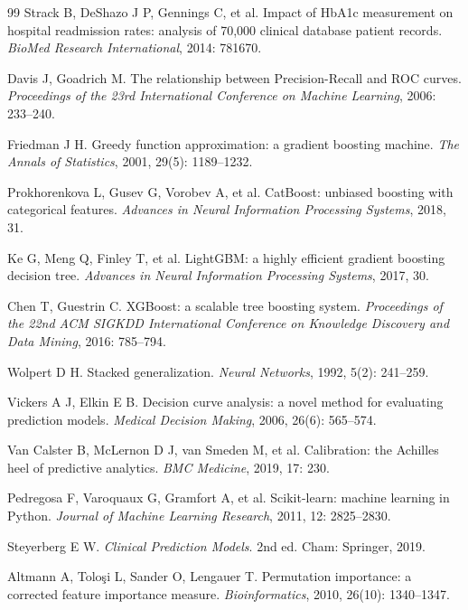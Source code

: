 \documentclass[UTF8,a4paper,11pt,fontset=none]{ctexart}
\begin{document}
\begin{thebibliography}{99}
\small
{}
Strack B, DeShazo J P, Gennings C, et al. Impact of HbA1c measurement on hospital readmission rates: analysis of 70,000 clinical database patient records. \textit{BioMed Research International}, 2014: 781670.

Davis J, Goadrich M. The relationship between Precision-Recall and ROC curves. \textit{Proceedings of the 23rd International Conference on Machine Learning}, 2006: 233--240.

Friedman J H. Greedy function approximation: a gradient boosting machine. \textit{The Annals of Statistics}, 2001, 29(5): 1189--1232.

Prokhorenkova L, Gusev G, Vorobev A, et al. CatBoost: unbiased boosting with categorical features. \textit{Advances in Neural Information Processing Systems}, 2018, 31.

Ke G, Meng Q, Finley T, et al. LightGBM: a highly efficient gradient boosting decision tree. \textit{Advances in Neural Information Processing Systems}, 2017, 30.

Chen T, Guestrin C. XGBoost: a scalable tree boosting system. \textit{Proceedings of the 22nd ACM SIGKDD International Conference on Knowledge Discovery and Data Mining}, 2016: 785--794.

Wolpert D H. Stacked generalization. \textit{Neural Networks}, 1992, 5(2): 241--259.

Vickers A J, Elkin E B. Decision curve analysis: a novel method for evaluating prediction models. \textit{Medical Decision Making}, 2006, 26(6): 565--574.

Van Calster B, McLernon D J, van Smeden M, et al. Calibration: the Achilles heel of predictive analytics. \textit{BMC Medicine}, 2019, 17: 230.

Pedregosa F, Varoquaux G, Gramfort A, et al. Scikit-learn: machine learning in Python. \textit{Journal of Machine Learning Research}, 2011, 12: 2825--2830.

Steyerberg E W. \textit{Clinical Prediction Models}. 2nd ed. Cham: Springer, 2019.

Altmann A, Tolo\c{s}i L, Sander O, Lengauer T. Permutation importance: a corrected feature importance measure. \textit{Bioinformatics}, 2010, 26(10): 1340--1347.


\end{thebibliography}
\end{document}
